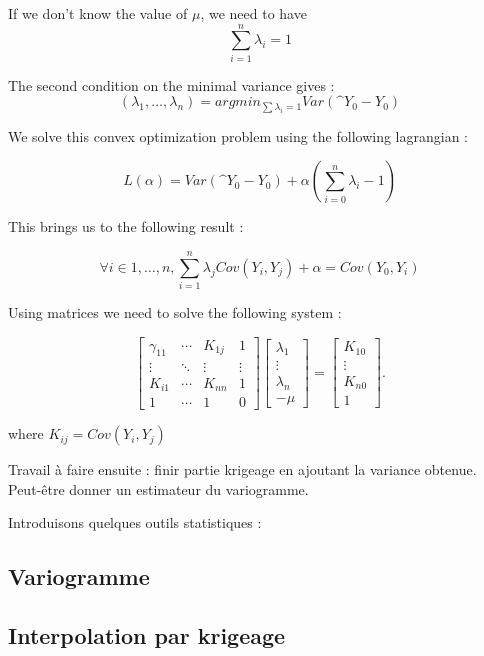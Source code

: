 \documentclass[hidelinks,12pt]{article}
\begin{document}
If we don't know the value of $\mu$, we need to have $$\sum_{i=1}^{n}\lambda_i=1$$

The second condition on the minimal variance gives : 
$$ (\lambda_1,\ldots,\lambda_n)=argmin_{\sum \lambda_i=1 } Var(\^{Y}_0-Y_0)$$

We solve this convex optimization problem using the following lagrangian :

$$L(\alpha)=Var(\^{Y}_0-Y_0)+\alpha(\sum_{i=0}^{n}\lambda_i-1)$$

This brings us to the following result :

$$\forall i \in {1,\ldots, n}, \sum_{i=1}^{n}\lambda_j Cov(Y_i,Y_j)+ \alpha = Cov(Y_0,Y_i)$$

Using matrices we need to solve the following system :

$$
\begin{bmatrix}
\gamma_{11}& \cdots  & K_{1j} & 1\\ \vdots & \ddots & \vdots & \vdots \\ K_{i1} & \cdots  & K_{nn} & 1 \\ 1 & \cdots & 1 & 0 
\end{bmatrix} 
\begin{bmatrix}
\lambda_1 \\ \vdots \\ \lambda_n \\ - \mu 
\end{bmatrix} = 
\begin{bmatrix} K_{10} \\ \vdots \\ K_{n0} \\ 1
\end{bmatrix}.$$

where $K_{ij}=Cov(Y_i,Y_j)$

Travail à faire ensuite : finir partie krigeage en ajoutant la variance obtenue. Peut-être donner un estimateur du variogramme. 



Introduisons quelques outils statistiques :

\subsection{Variogramme}





\subsection{Interpolation par krigeage}
\end{document}
